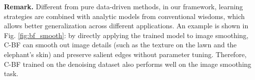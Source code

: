 \documentclass[twocolumn]{svjour3}          %
\begin{document}
\textbf{Remark.} Different from pure data-driven methods, in our framework, learning strategies are combined with analytic models from conventional wisdoms, which allows better generalization across different applications. An example is shown in Fig. \ref{fig:bf_smooth}: by directly applying the trained model to image smoothing, C-BF can smooth out image details (such as the texture on the lawn and the elephant's skin) and preserve salient edges without parameter tuning.
Therefore, C-BF trained on the denoising dataset also performs well on the image smoothing task.

\begin{figure*}[!th]
\end{figure*}
\end{document}
